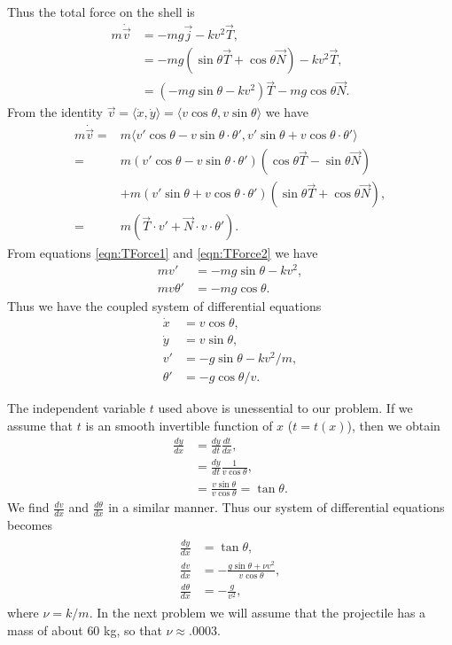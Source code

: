 Thus the total force on the shell is
\begin{align}
m \dot{\vec{v}} &= -mg \vec{j} - kv^2 \vec{T},\nonumber \\
&= -mg( \sin{\theta} \vec{T} + \cos{\theta} \vec{N} ) - kv^2 \vec{T},\nonumber\\
&= (-mg \sin{\theta} - k v^2 ) \vec{T} - mg \cos{\theta} \vec{N}.\label{eqn:TForce1}
\end{align}
From the identity
$\vec{v} = \langle \dot{x}, \dot{y} \rangle = \langle v \cos{\theta}, v \sin{\theta} \rangle$ 
we have 
\begin{align}
m \dot{\vec{v}} = {} & m\langle v' \cos{\theta} - v\sin{\theta} \cdot \theta' ,v'\sin{\theta} + v\cos{\theta} \cdot \theta' \rangle \nonumber \\
= {} & m(v'\cos{\theta} - v\sin{\theta} \cdot \theta')(\cos{\theta} \vec{T} - \sin{\theta}\vec{N}) \nonumber \\
& + m(v' \sin{\theta} + v\cos{\theta} \cdot \theta')( \sin{\theta} \vec{T} + \cos{\theta} \vec{N}) ,  \nonumber \\
= {} & m(\vec{T} \cdot v' + \vec{N} \cdot v \cdot \theta') . \label{eqn:TForce2}
\end{align}
From equations \eqref{eqn:TForce1} and \eqref{eqn:TForce2} we have
\begin{align*}
mv' &= -mg\sin{\theta} - k v^2,\\
mv\theta' &= -mg \cos{\theta}.
\end{align*}
Thus we have the coupled system of differential equations
\begin{align}
\dot{x} &= v\cos{\theta}, \nonumber \\
\dot{y} &= v\sin{\theta},\nonumber \\
v' &= -g\sin{\theta} -  k v^2/m,\nonumber \\
\theta' &= -g \cos{\theta}/v. \nonumber
\end{align}

The independent variable $t$ used above is unessential to our problem.
If we assume that $t$ is an smooth invertible function of $x$ ($t = t(x)$), then we obtain 
\begin{align*}
\frac{dy}{dx} &= \frac{dy}{dt}\frac{dt}{dx} ,\\
&= \frac{dy}{dt} \frac{1}{v\cos{\theta}}, \\
&= \frac{v \sin{\theta}}{v\cos{\theta}} = \tan{\theta}.
\end{align*}
We find $\frac{dv}{dx}$ and $\frac{d\theta}{dx}$ in a similar manner.
Thus our system of differential equations becomes 
\begin{align}
	\begin{split}
\frac{dy}{dx} &= \tan {\theta} ,\\
\frac{dv}{dx} &= -\frac{g \sin{\theta} + \nu v^2}{v \cos{\theta}},\\
\frac{d\theta}{dx} &= -\frac{g}{v^2}, \label{eqn:cannon_DEs}
	\end{split}
\end{align}
where $\nu = k/m.$
In the next problem we will assume that the projectile has a mass of about $60$ kg, so that $\nu \approx .0003$.

